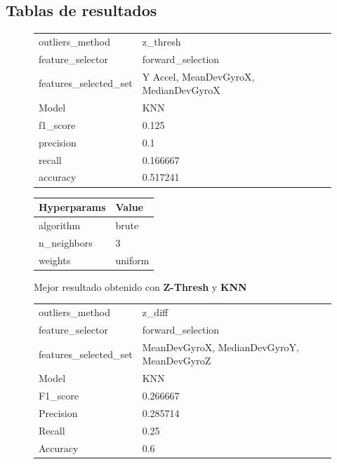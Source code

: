 \begin{appendices}
	\section*{Tablas de resultados}
		\begin{figure}[htb]
			\centering
			\begin{tabular}{ll}
				\toprule
					  outliers\_method &                                z\_thresh \\
					 feature\_selector &                       forward\_selection \\
				features\_selected\_set & {Y Accel, MeanDevGyroX, MedianDevGyroX} \\
								Model &                                     KNN \\
						f1\_score &                                   0.125 \\
					   precision &                                     0.1 \\
						  recall &                                0.166667 \\
						accuracy &                                0.517241 \\
				\bottomrule
			\end{tabular}
			\newline
			\newline

			\begin{tabular}{ll}
				\toprule
				Hyperparams &   Value \\
				\midrule
				  algorithm &   brute \\
				n\_neighbors &       3 \\
					weights & uniform \\
				\bottomrule
			\end{tabular}
			\caption{Mejor resultado obtenido con \textbf{Z-Thresh} y \textbf{KNN}}
			\label{table:14}
		\end{figure}

		\begin{figure}[htb]
			\centering
			\begin{tabular}{ll}
				\toprule
					  outliers\_method &                                       z\_diff \\
					 feature\_selector &                            forward\_selection \\
				features\_selected\_set & {MeanDevGyroX, MedianDevGyroY, MeanDevGyroZ} \\
								Model &                                          KNN \\
						F1\_score &                                     0.266667 \\
					   Precision &                                     0.285714 \\
						  Recall &                                         0.25 \\
						Accuracy &                                          0.6 \\
				\bottomrule
			\end{tabular}
			\newline
			\newline


\end{figure}
\end{appendices}
